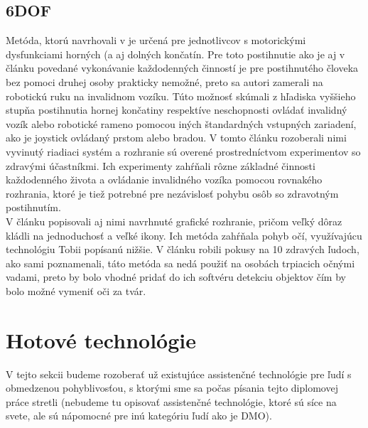 \subsection{6DOF}
\tab[5 mm] Metóda, ktorú navrhovali v \cite{sunny2021eye} je určená pre jednotlivcov s motorickými dysfunkciami horných (a aj dolných končatín. Pre toto postihnutie ako je aj v článku povedané vykonávanie každodenných činností je pre postihnutého človeka bez pomoci druhej osoby prakticky nemožné, preto sa autori zamerali na robotickú ruku na invalidnom vozíku. Túto možnosť skúmali z hľadiska vyššieho stupňa postihnutia hornej končatiny respektíve neschopnosti ovládať invalidný vozík alebo robotické rameno pomocou iných štandardných vstupných zariadení, ako je joystick ovládaný prstom alebo bradou. V tomto článku rozoberali nimi vyvinutý riadiaci systém a rozhranie sú overené prostredníctvom experimentov so zdravými účastníkmi. Ich experimenty zahŕňali rôzne základné činnosti každodenného života a ovládanie invalidného vozíka pomocou rovnakého rozhrania, ktoré je tiež potrebné pre nezávislosť pohybu osôb so zdravotným postihnutím. \\
\tab[5 mm] V článku popisovali aj nimi navrhnuté grafické rozhranie, pričom veľký dôraz kládli na jednoduchosť a veľké ikony. Ich metóda zahŕňala pohyb očí, využívajúcu technológiu Tobii popísanú nižšie. V článku robili pokusy na 10 zdravých ľudoch, ako sami poznamenali, táto metóda sa nedá použiť na osobách trpiacich očnými vadami, preto by bolo vhodné pridať do ich softvéru detekciu objektov čím by bolo možné vymeniť oči za tvár.
\section{Hotové technológie}
\tab[5 mm] V tejto sekcii budeme rozoberať už existujúce assistenčné technológie pre ľudí s obmedzenou pohyblivosťou, s ktorými sme sa počas písania tejto diplomovej práce stretli (nebudeme tu opisovať assistenčné technológie, ktoré sú síce na svete, ale sú nápomocné pre inú kategóriu ľudí ako je DMO).
